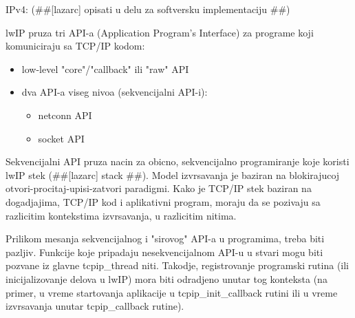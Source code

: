 \documentclass[a4paper,12pt, master]{etf}
\begin{document}
	IPv4: (\#\#[lazarc] opisati u delu za softversku implementaciju \#\#)

	lwIP pruza tri API-a (Application Program's Interface) za programe koji komuniciraju sa 
	TCP/IP kodom:
	\begin{itemize}
		\item low-level "core"/"callback" ili "raw" API
		\item dva API-a viseg nivoa (sekvencijalni API-i):
			\begin{itemize}
				\item netconn API
				\item socket API
			\end{itemize}
	\end{itemize}

	Sekvencijalni API pruza nacin za obicno, sekvencijalno programiranje koje koristi lwIP stek
	(\#\#[lazarc] stack \#\#). Model izvrsavanja je baziran na blokirajucoj
	otvori-procitaj-upisi-zatvori paradigmi. Kako je TCP/IP stek baziran na dogadjajima, 
	TCP/IP kod i aplikativni program, moraju da se pozivaju sa razlicitim kontekstima 
	izvrsavanja, u razlicitim nitima.

	Prilikom mesanja sekvencijalnog i "sirovog" API-a u programima, treba biti pazljiv. 
	Funkcije koje pripadaju nesekvencijalnom API-u u stvari mogu biti pozvane iz glavne 
	tcpip\_thread niti.
	Takodje, registrovanje programski rutina (ili inicijalizovanje delova u lwIP) mora biti
	odradjeno unutar tog konteksta (na primer, u vreme startovanja aplikacije u 
	tcpip\_init\_callback rutini ili u vreme izvrsavanja unutar tcpip\_callback rutine).
\end{document}
